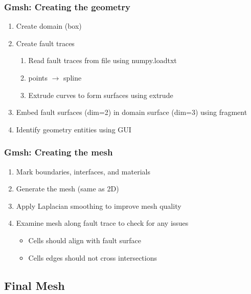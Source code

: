 \documentclass[aspectratio=169]{beamer}
\begin{document}
\begin{frame}
  \frametitle{Gmsh: Creating the geometry}
  \summary{}
  
  \begin{enumerate}
  \item Create domain (box)\pause
  \item Create fault traces
    \begin{enumerate}
    \item Read fault traces from file using {\ttfamily numpy.loadtxt}
    \item points $\rightarrow$ spline
    \item Extrude curves to form surfaces using {\ttfamily extrude}
    \end{enumerate}\pause
  \item Embed fault surfaces (dim=2) in domain surface (dim=3) using {\ttfamily fragment}\pause
  \item Identify geometry entities using GUI
  \end{enumerate}
  
\end{frame}


\begin{frame}
  \frametitle{Gmsh: Creating the mesh}
  
  \begin{enumerate}
  \item Mark boundaries, interfaces, and materials
  \item Generate the mesh (same as 2D)
  \item Apply Laplacian smoothing to improve mesh quality
  \item Examine mesh along fault trace to check for any issues
    \begin{itemize}
    \item Cells should align with fault surface
    \item Cells edges should not cross intersections
    \end{itemize}
  \end{enumerate}
  
\end{frame}


\subsection{Final Mesh}
\end{document}
